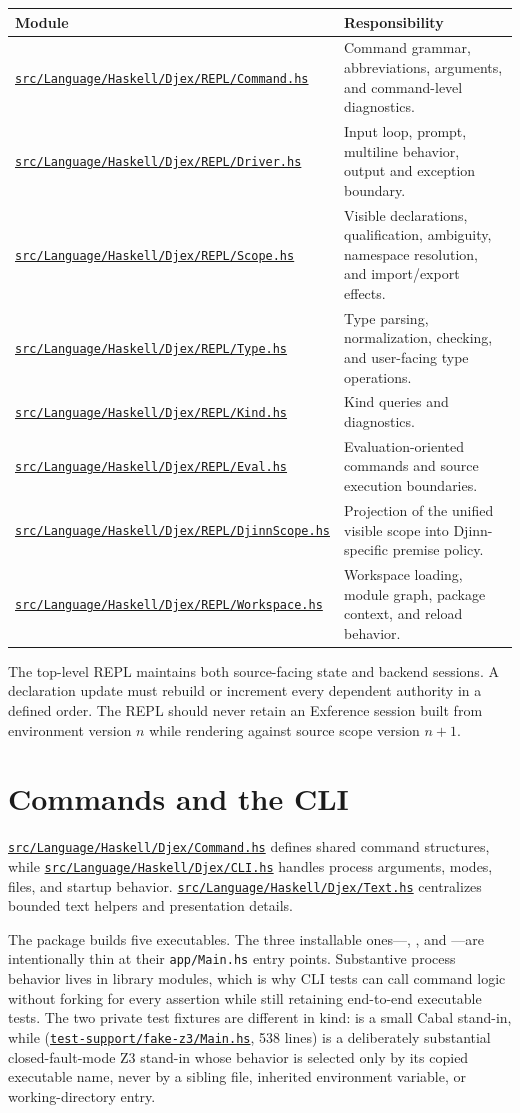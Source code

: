 \documentclass[10pt,letterpaper,oneside]{report}
\newcommand{\code}[1]{\texttt{\detokenize{#1}}}
\newcommand{\filepath}[1]{\nolinkurl{#1}}
\def\DjexBase{https://github.com/VladimirReshetnikov/Djex/blob/d3d9662598460316bdcd177ce6768c521e764aa8/}
\newcommand{\dpath}[1]{\href{\DjexBase#1}{\nolinkurl{#1}}}
\begin{document}
\begin{longtable}{@{}L{0.31\textwidth}L{0.61\textwidth}@{}}
\toprule
\textbf{Module} & \textbf{Responsibility} \\
\midrule
\endhead
\dpath{src/Language/Haskell/Djex/REPL/Command.hs} & Command grammar, abbreviations, arguments, and command-level diagnostics. \\
\dpath{src/Language/Haskell/Djex/REPL/Driver.hs} & Input loop, prompt, multiline behavior, output and exception boundary. \\
\dpath{src/Language/Haskell/Djex/REPL/Scope.hs} & Visible declarations, qualification, ambiguity, namespace resolution, and import/export effects. \\
\dpath{src/Language/Haskell/Djex/REPL/Type.hs} & Type parsing, normalization, checking, and user-facing type operations. \\
\dpath{src/Language/Haskell/Djex/REPL/Kind.hs} & Kind queries and diagnostics. \\
\dpath{src/Language/Haskell/Djex/REPL/Eval.hs} & Evaluation-oriented commands and source execution boundaries. \\
\dpath{src/Language/Haskell/Djex/REPL/DjinnScope.hs} & Projection of the unified visible scope into Djinn-specific premise policy. \\
\dpath{src/Language/Haskell/Djex/REPL/Workspace.hs} & Workspace loading, module graph, package context, and reload behavior. \\
\bottomrule
\end{longtable}

The top-level REPL maintains both source-facing state and backend sessions. A declaration update must rebuild or increment every dependent authority in a defined order. The REPL should never retain an Exference session built from environment version \(n\) while rendering against source scope version \(n+1\).

\section{Commands and the CLI}

\dpath{src/Language/Haskell/Djex/Command.hs} defines shared command structures, while \dpath{src/Language/Haskell/Djex/CLI.hs} handles process arguments, modes, files, and startup behavior. \dpath{src/Language/Haskell/Djex/Text.hs} centralizes bounded text helpers and presentation details.

The package builds five executables. The three installable ones---\code{djex}, \code{djinn}, and \code{exference}---are intentionally thin at their \filepath{app/Main.hs} entry points. Substantive process behavior lives in library modules, which is why CLI tests can call command logic without forking for every assertion while still retaining end-to-end executable tests. The two private test fixtures are different in kind: \code{djex-fake-cabal} is a small Cabal stand-in, while \code{djex-fake-z3} (\dpath{test-support/fake-z3/Main.hs}, 538 lines) is a deliberately substantial closed-fault-mode Z3 stand-in whose behavior is selected only by its copied executable name, never by a sibling file, inherited environment variable, or working-directory entry.
\end{document}
